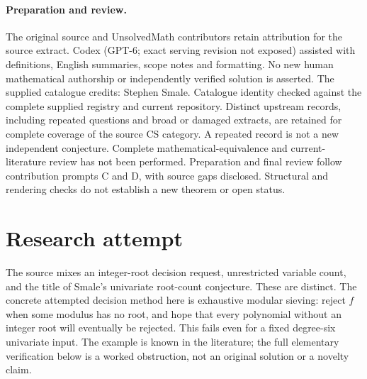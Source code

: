\documentclass[11pt]{article}
\begin{document}
\paragraph{Preparation and review.}
The original source and UnsolvedMath contributors retain attribution for the source extract. Codex (GPT-6; exact serving revision not exposed) assisted with definitions, English summaries, scope notes and formatting. No new human mathematical authorship or independently verified solution is asserted. The supplied catalogue credits: Stephen Smale. Catalogue identity checked against the complete supplied registry and current repository. Distinct upstream records, including repeated questions and broad or damaged extracts, are retained for complete coverage of the source CS category. A repeated record is not a new independent conjecture. Complete mathematical-equivalence and current-literature review has not been performed. Preparation and final review follow contribution prompts C and D, with source gaps disclosed. Structural and rendering checks do not establish a new theorem or open status.
\label{end:statement}


\section{Research attempt}
The source mixes an integer-root decision request, unrestricted variable count, and the title of Smale's univariate root-count conjecture. These are distinct. The concrete attempted decision method here is exhaustive modular sieving: reject $f$ when some modulus has no root, and hope that every polynomial without an integer root will eventually be rejected. This fails even for a fixed degree-six univariate input. The example is known in the literature; the full elementary verification below is a worked obstruction, not an original solution or a novelty claim.
\end{document}

